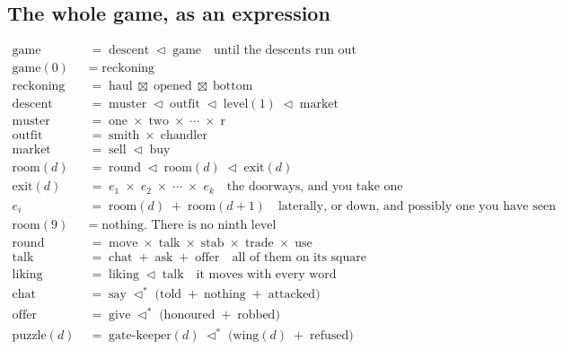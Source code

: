 \documentclass[11pt,a4paper]{article}
\newcommand{\seqb}{\lhd^{\ast}}
\begin{document}
\subsection{The whole game, as an expression}

\begin{align*}
\text{game}       \;&=\; \text{descent} \;\lhd\; \text{game} \quad\text{until the descents run out} \\[1.5mm]
\text{game}(0)    \;&=\; \text{reckoning} \\[1.5mm]
\text{reckoning}  \;&=\; \text{haul} \;\boxtimes\; \text{opened} \;\boxtimes\; \text{bottom} \\[3mm]
\text{descent}    \;&=\; \text{muster} \;\lhd\; \text{outfit} \;\lhd\; \text{level}(1) \;\lhd\; \text{market} \\[1.5mm]
\text{muster}     \;&=\; \text{one} \;\times\; \text{two} \;\times\; \cdots \;\times\; \text{r} \\[1.5mm]
\text{outfit}     \;&=\; \text{smith} \;\times\; \text{chandler} \\[1.5mm]
\text{market}     \;&=\; \text{sell} \;\lhd\; \text{buy} \\[3mm]
\text{room}(d)    \;&=\; \text{round} \;\lhd\; \text{room}(d) \;\lhd\; \text{exit}(d) \\[1.5mm]
\text{exit}(d)    \;&=\; e_1 \;\times\; e_2 \;\times\; \cdots \;\times\; e_k \quad\text{the doorways, and you take one} \\[1.5mm]
e_i               \;&=\; \text{room}(d) \;+\; \text{room}(d{+}1) \quad\text{laterally, or down, and possibly one you have seen} \\[1.5mm]
\text{room}(9)    \;&=\; \text{nothing. There is no ninth level} \\[3mm]
\text{round}      \;&=\; \text{move} \;\times\; \text{talk} \;\times\; \text{stab} \;\times\; \text{trade} \;\times\; \text{use} \\[1.5mm]
\text{talk}       \;&=\; \text{chat} \;+\; \text{ask} \;+\; \text{offer} \quad\text{all of them on its square} \\[1.5mm]
\text{liking}     \;&=\; \text{liking} \;\lhd\; \text{talk} \quad\text{it moves with every word} \\[3mm]
\text{chat}       \;&=\; \text{say} \;\seqb\; \bigl( \text{told} \;+\; \text{nothing} \;+\; \text{attacked} \bigr) \\[1.5mm]
\text{offer}      \;&=\; \text{give} \;\seqb\; \bigl( \text{honoured} \;+\; \text{robbed} \bigr) \\[1.5mm]
\text{puzzle}(d)  \;&=\; \text{gate-keeper}(d) \;\seqb\; \bigl( \text{wing}(d) \;+\; \text{refused} \bigr)
\end{align*}
\end{document}

